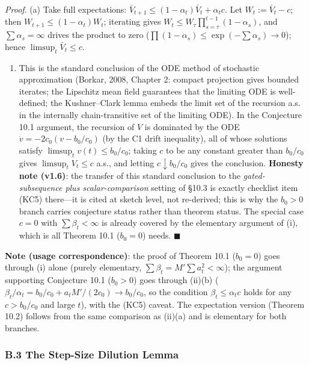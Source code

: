 \documentclass[
  11pt]{article}
\providecommand{\tightlist}{%
  \setlength{\itemsep}{0pt}\setlength{\parskip}{0pt}}
\begin{document}
\emph{Proof}. (a) Take full expectations:
\(\bar V_{t+1} \le (1-\alpha_t)\bar V_t + \alpha_t c\). Let
\(W_t := \bar V_t - c\); then \(W_{t+1} \le (1-\alpha_t)W_t\); iterating
gives \(W_t \le W_\tau \prod_{s=\tau}^{t-1}(1-\alpha_s)\), and
\(\sum\alpha_s = \infty\) drives the product to zero
(\(\prod(1-\alpha_s) \le \exp(-\sum\alpha_s) \to 0\)); hence
\(\limsup_t \bar V_t \le c\).

\begin{enumerate}
\def\labelenumi{(\alph{enumi})}
\setcounter{enumi}{1}
\tightlist
\item
  This is the standard conclusion of the ODE method of stochastic
  approximation (Borkar, 2008, Chapter 2: compact projection gives
  bounded iterates; the Lipschitz mean field guarantees that the
  limiting ODE is well-defined; the Kushner--Clark lemma embeds the
  limit set of the recursion a.s. in the internally chain-transitive set
  of the limiting ODE). In the Conjecture 10.1 argument, the recursion
  of \(V\) is dominated by the ODE \(\dot v = -2c_0(v - b_0/c_0)\) (by
  the C1 drift inequality), all of whose solutions satisfy
  \(\limsup_t v(t) \le b_0/c_0\); taking \(c\) to be any constant
  greater than \(b_0/c_0\) gives \(\limsup_t V_t \le c\) a.s., and
  letting \(c \downarrow b_0/c_0\) gives the conclusion. \textbf{Honesty
  note (v1.6)}: the transfer of this standard conclusion to the
  \emph{gated-subsequence plus scalar-comparison} setting of §10.3 is
  exactly checklist item (KC5) there---it is cited at sketch level, not
  re-derived; this is why the \(b_0>0\) branch carries conjecture status
  rather than theorem status. The special case \(c = 0\) with
  \(\sum\beta_t < \infty\) is already covered by the elementary argument
  of (i), which is all Theorem 10.1 (\(b_0 = 0\)) needs.
  \(\blacksquare\)
\end{enumerate}

\textbf{Note (usage correspondence)}: the proof of Theorem 10.1
(\(b_0 = 0\)) goes through (i) alone (purely elementary,
\(\sum\beta_t = M'\sum a_t^2 < \infty\)); the argument supporting
Conjecture 10.1 (\(b_0 > 0\)) goes through (ii)(b)
(\(\beta_t/\alpha_t = b_0/c_0 + a_tM'/(2c_0) \to b_0/c_0\), so the
condition \(\beta_t \le \alpha_tc\) holds for any \(c > b_0/c_0\) and
large \(t\)), with the (KC5) caveat. The expectation version (Theorem
10.2) follows from the same comparison as (ii)(a) and is elementary for
both branches.

\subsubsection{B.3 The Step-Size Dilution
Lemma}\label{b.3-the-step-size-dilution-lemma}
\end{document}
